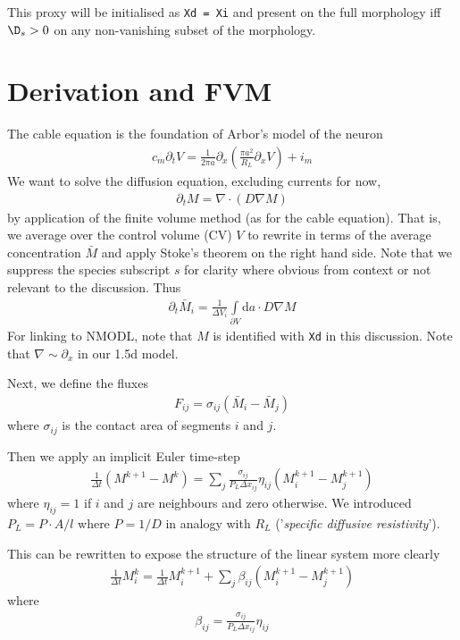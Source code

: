 \documentclass[a4paper]{article}
\begin{document}
This proxy will be initialised as \texttt{Xd = Xi} and present on the full morphology
iff \(\D_{s} > 0\) on any non-vanishing subset of the morphology.

\section{Derivation and FVM}
\label{sec:org06e2271}

The cable equation is the foundation of Arbor's model of the neuron
\begin{align*}
    c_{m} \partial_{t} V = \frac{1}{2 \pi a} \partial_{x} \left(\frac{\pi a^{2}}{R_{L}} \partial_{x} V\right) + i_{m}
\end{align*}
We want to solve the diffusion equation, excluding currents for now,
\begin{align*}
\partial_{t} M = \nabla \cdot (D \nabla M)
\end{align*}
by application of the finite volume method (as for the cable equation). That is,
we average over the control volume (CV) \(V\) to rewrite in terms of the average
concentration \(\bar{M}\) and apply Stoke's theorem on the right hand side. Note
that we suppress the species subscript \(s\) for clarity where obvious from
context or not relevant to the discussion. Thus
\begin{align*}
\partial_{t} \bar M_{i} = \frac{1}{\Delta V_{i}}\int\limits_{\partial V} \mathrm{d}a \cdot D \nabla M
\end{align*}
For linking to NMODL, note that \(M\) is identified with \texttt{Xd} in this discussion.
Note that \(\nabla \sim \partial_{x}\) in our 1.5d model.

Next, we define the fluxes
\begin{align*}
F_{ij} = \sigma_{ij}(\bar M_{i} - \bar M_{j})
\end{align*}
where \(\sigma_{ij}\) is the contact area of segments \(i\) and \(j\).

Then we apply an implicit Euler time-step
\begin{align*}
\frac{1}{\Delta t} \left(M^{k+1} - M^{k}\right) = \sum_{j}\frac{\sigma_{ij}}{P_{L}\Delta x_{ij}}\eta_{ij} \left(M_{i}^{k+1} - M_{j}^{k+1}\right)
\end{align*}
where \(\eta_{ij} = 1\) if \(i\) and \(j\) are neighbours and zero otherwise. We introduced
\(P_L = P \cdot A/l\) where \(P = 1/D\) in analogy with \(R_{L}\) ('\emph{specific diffusive
resistivity}').

This can be rewritten to expose the structure of the linear system more clearly
\begin{align*}
\frac{1}{\Delta t}M_{i}^{k}= \frac{1}{\Delta t}M_{i}^{k+1} + \sum\limits_{j}\beta_{ij} \left(M_{i}^{k+1} - M_{j}^{k+1} \right)
\end{align*}
where
\begin{align*}
\beta_{ij} = \frac{\sigma_{ij}}{P_{L} \Delta x_{ij}}\eta_{ij}
\end{align*}
\end{document}
